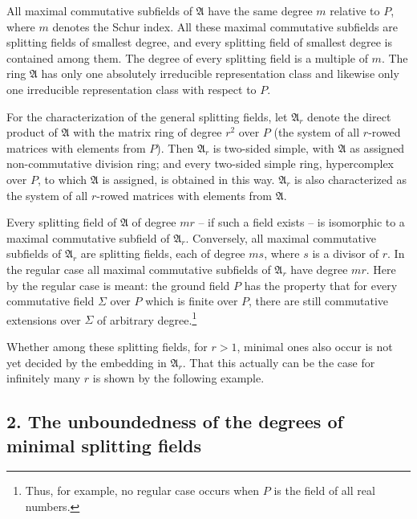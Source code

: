 \documentclass[11pt]{article}
\providecommand{\mA}{\mathfrak{A}}
\begin{document}
All maximal commutative subfields of $\mA$ have the same degree $m$ relative to $P$, where $m$ denotes the Schur index. All these maximal commutative subfields are splitting fields of smallest degree, and every splitting field of smallest degree is contained among them. The degree of every splitting field is a multiple of $m$. The ring $\mA$ has only one absolutely irreducible representation class and likewise only one irreducible representation class with respect to $P$.

For the characterization of the general splitting fields, let $\mA_r$ denote the direct product of $\mA$ with the matrix ring of degree $r^2$ over $P$ (the system of all $r$-rowed matrices with elements from $P$). Then $\mA_r$ is two-sided simple, with $\mA$ as assigned non-commutative division ring; and every two-sided simple ring, hypercomplex over $P$, to which $\mA$ is assigned, is obtained in this way. $\mA_r$ is also characterized as the system of all $r$-rowed matrices with elements from $\mA$.

Every splitting field of $\mA$ of degree $mr$ -- if such a field exists -- is isomorphic to a maximal commutative subfield of $\mA_r$. Conversely, all maximal commutative subfields of $\mA_r$ are splitting fields, each of degree $ms$, where $s$ is a divisor of $r$. In the regular case all maximal commutative subfields of $\mA_r$ have degree $mr$. Here by the regular case is meant: the ground field $P$ has the property that for every commutative field $\Sigma$ over $P$ which is finite over $P$, there are still commutative extensions over $\Sigma$ of arbitrary degree.\footnote{Thus, for example, no regular case occurs when $P$ is the field of all real numbers.}

Whether among these splitting fields, for $r>1$, minimal ones also occur is not yet decided by the embedding in $\mA_r$. That this actually can be the case for infinitely many $r$ is shown by the following example.

\subsection*{2. The unboundedness of the degrees of minimal splitting fields}
\end{document}
